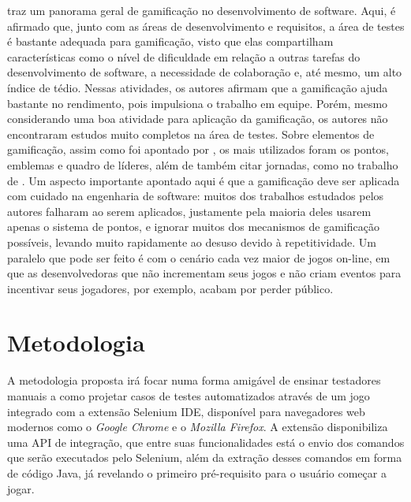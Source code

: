\documentclass[twoside,english,brazilian]{UNISINOSartigo}
\begin{document}
\cite{Pedreira} traz um panorama geral de gamificação no desenvolvimento de software. Aqui, é afirmado que, junto com as áreas de desenvolvimento e requisitos, a área de testes é bastante adequada para gamificação, visto que elas compartilham características como o nível de dificuldade em relação a outras tarefas do desenvolvimento de software, a necessidade de colaboração e, até mesmo, um alto índice de tédio. Nessas atividades, os autores afirmam que a gamificação ajuda bastante no rendimento, pois impulsiona o trabalho em equipe. Porém, mesmo considerando uma boa atividade para aplicação da gamificação, os autores não encontraram estudos muito completos na área de testes. Sobre elementos de gamificação, assim como foi apontado por \cite{DeJesus}, os mais utilizados foram os pontos, emblemas e quadro de líderes, além de também citar jornadas, como no trabalho de \cite{Houshmand}. Um aspecto importante apontado aqui é que a gamificação deve ser aplicada com cuidado na engenharia de software: muitos dos trabalhos estudados pelos autores falharam ao serem aplicados, justamente pela maioria deles usarem apenas o sistema de pontos, e ignorar muitos dos mecanismos de gamificação possíveis, levando muito rapidamente ao desuso devido à repetitividade. Um paralelo que pode ser feito é com o cenário cada vez maior de jogos on-line, em que as desenvolvedoras que não incrementam seus jogos e não criam eventos para incentivar seus jogadores, por exemplo, acabam por perder público. 



\section{Metodologia}

A metodologia proposta irá focar numa forma amigável de ensinar testadores manuais a como projetar casos de testes automatizados através de um jogo integrado com a extensão Selenium IDE, disponível para navegadores web modernos como o \textit{Google Chrome} e o \textit{Mozilla Firefox}. A extensão disponibiliza uma API de integração, que entre suas funcionalidades está o envio dos comandos que serão executados pelo Selenium, além da extração desses comandos em forma de código Java, já revelando o primeiro pré-requisito para o usuário começar a jogar.
\end{document}
